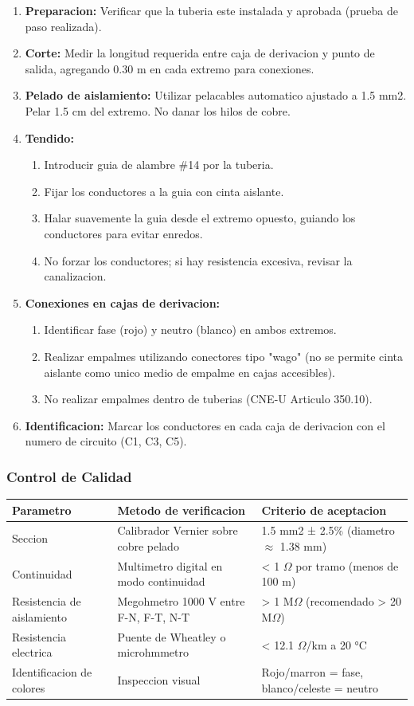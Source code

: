 \begin{enumerate}
  \item \textbf{Preparacion:} Verificar que la tuberia este instalada y aprobada (prueba de paso realizada).
  \item \textbf{Corte:} Medir la longitud requerida entre caja de derivacion y punto de salida, agregando 0.30 m en cada extremo para conexiones.
  \item \textbf{Pelado de aislamiento:} Utilizar pelacables automatico ajustado a 1.5 mm2. Pelar 1.5 cm del extremo. No danar los hilos de cobre.
  \item \textbf{Tendido:}
  \begin{enumerate}
    \item Introducir guia de alambre \#14 por la tuberia.
    \item Fijar los conductores a la guia con cinta aislante.
    \item Halar suavemente la guia desde el extremo opuesto, guiando los conductores para evitar enredos.
    \item No forzar los conductores; si hay resistencia excesiva, revisar la canalizacion.
  \end{enumerate}
  \item \textbf{Conexiones en cajas de derivacion:}
  \begin{enumerate}
    \item Identificar fase (rojo) y neutro (blanco) en ambos extremos.
    \item Realizar empalmes utilizando conectores tipo "wago" (no se permite cinta aislante como unico medio de empalme en cajas accesibles).
    \item No realizar empalmes dentro de tuberias (CNE-U Articulo 350.10).
  \end{enumerate}
  \item \textbf{Identificacion:} Marcar los conductores en cada caja de derivacion con el numero de circuito (C1, C3, C5).
\end{enumerate}

\subsubsection{Control de Calidad}

\begin{longtable}{L{4.5cm} L{4.5cm} L{4.5cm}}
\toprule
\textbf{Parametro} & \textbf{Metodo de verificacion} & \textbf{Criterio de aceptacion} \\
\midrule
Seccion & Calibrador Vernier sobre cobre pelado & 1.5 mm2 ± 2.5\% (diametro $\approx$ 1.38 mm) \\
Continuidad & Multimetro digital en modo continuidad & < 1 $\Omega$ por tramo (menos de 100 m) \\
Resistencia de aislamiento & Megohmetro 1000 V entre F-N, F-T, N-T & > 1 M$\Omega$ (recomendado > 20 M$\Omega$) \\
Resistencia electrica & Puente de Wheatley o microhmmetro & < 12.1 $\Omega$/km a 20 °C \\
Identificacion de colores & Inspeccion visual & Rojo/marron = fase, blanco/celeste = neutro \\
\bottomrule
\end{longtable}

